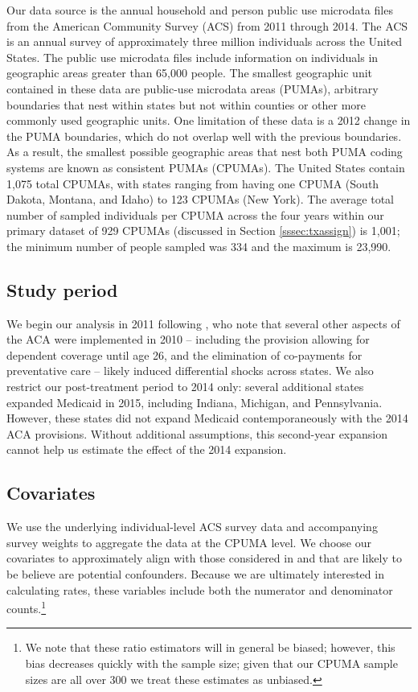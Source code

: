\documentclass[12pt]{article}
\begin{document}
Our data source is the annual household and person public use microdata files from the American Community Survey (ACS) from 2011 through 2014. The ACS is an annual survey of approximately three million individuals across the United States. The public use microdata files include information on individuals in geographic areas greater than 65,000 people. The smallest geographic unit contained in these data are public-use microdata areas (PUMAs), arbitrary boundaries that nest within states but not within counties or other more commonly used geographic units. One limitation of these data is a 2012 change in the PUMA boundaries, which do not overlap well with the previous boundaries. As a result, the smallest possible geographic areas that nest both PUMA coding systems are known as consistent PUMAs (CPUMAs). The United States contain 1,075 total CPUMAs, with states ranging from having one CPUMA (South Dakota, Montana, and Idaho) to 123 CPUMAs (New York). The average total number of sampled individuals per CPUMA across the four years within our primary dataset of 929 CPUMAs (discussed in Section \ref{sssec:txassign}) is 1,001; the minimum number of people sampled was 334 and the maximum is 23,990.

\subsection{Study period}

We begin our analysis in 2011 following \cite{courtemanche2017early}, who note that several other aspects of the ACA were implemented in 2010 -- including the provision allowing for dependent coverage until age 26, and the elimination of co-payments for preventative care -- likely induced differential shocks across states. We also restrict our post-treatment period to 2014 only: several additional states expanded Medicaid in 2015, including Indiana, Michigan, and Pennsylvania. However, these states did not expand Medicaid contemporaneously with the 2014 ACA provisions. Without additional assumptions, this second-year expansion cannot help us estimate the effect of the 2014 expansion. 

\subsection{Covariates}

We use the underlying individual-level ACS survey data and accompanying survey weights to aggregate the data at the CPUMA level. We choose our covariates to approximately align with those considered in \cite{courtemanche2017early} and that are likely to be believe are potential confounders. Because we are ultimately interested in calculating rates, these variables include both the numerator and denominator counts.\footnote{We note that these ratio estimators will in general be biased; however, this bias decreases quickly with the sample size; given that our CPUMA sample sizes are all over 300 we treat these estimates as unbiased.}
\end{document}
